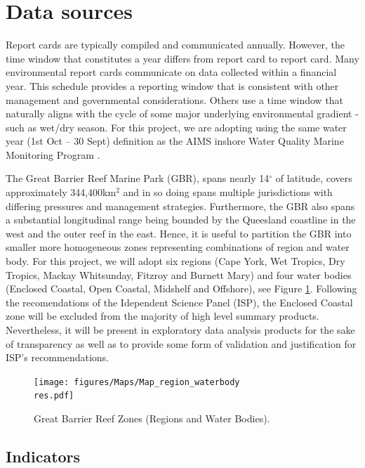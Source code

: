 \section{Data sources}\label{sec:sources}

Report cards are typically compiled and communicated annually.  However, the time window that
constitutes a year differs from report card to report card.  Many environmental report cards
communicate on data collected within a financial year.  This schedule provides a reporting window
that is consistent with other management and governmental considerations.  Others use a time window
that naturally aligns with the cycle of some major underlying environmental gradient - such as
wet/dry season. For this project, we are adopting using the same water year (1st Oct -- 30 Sept)
definition as the AIMS inshore Water Quality Marine Monitoring Program \citep{Lonborg-MMP-2015}.

The Great Barrier Reef Marine Park (GBR), spans nearly 14$^\circ$ of latitude, covers approximately
344,400km$^2$ and in so doing spans multiple jurisdictions with differing pressures and management strategies.
Furthermore, the GBR also spans a substantial longitudinal range being bounded by the Queesland coastline in the west and the outer reef in the east.
Hence, it is useful to partition
the GBR into smaller more homogeneous zones representing combinations of region and water body.
For this project, we will adopt
six regions (Cape York, Wet Tropics, Dry Tropics, Mackay Whitsunday, Fitzroy and Burnett Mary) and
four water bodies (Enclosed Coastal, Open Coastal, Midshelf and Offshore), see Figure \ref{fig:Map_region_waterbody}.
Following the recomendations of the Idependent Science Panel (ISP), the Enclosed Coastal zone will be
excluded from the majority of high level summary products.  Nevertheless, it will be present in exploratory
data analysis products for the sake of transparency as well as to provide some form of validation and
justification for ISP's recommendations.
 

  
\begin{figure}[ptbh] \texttt{[image: figures/Maps/Map\_region\_waterbody\\res.pdf]}
\caption{Great Barrier Reef Zones (Regions and Water Bodies).}\label{fig:Map_region_waterbody}
\end{figure}
   

 

\subsection{Indicators}

